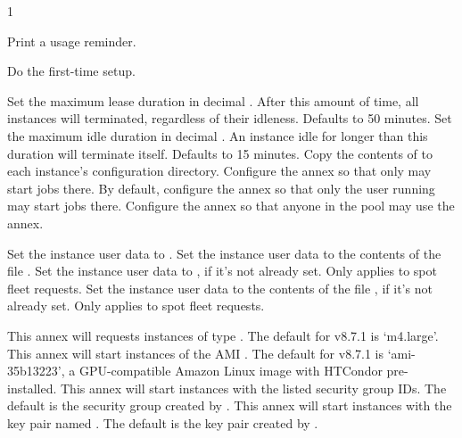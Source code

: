 \begin{ManPage}{\label{man-condor-annex}}{1}
\begin{Options}
		{Print a usage reminder.}

		{Do the first-time setup.}

		{Set the maximum lease duration in decimal .  After this amount of time, all instances will terminated, regardless of their idleness.  Defaults to 50 minutes.}
		{Set the maximum idle duration in decimal .  An instance idle for longer than this duration will terminate itself.  Defaults to 15 minutes.}
		{Copy the contents of  to each instance's configuration directory.}
		{Configure the annex so that only  may start jobs there.  By default, configure the annex so that only the user running  may start jobs there.}
		{Configure the annex so that anyone in the pool may use the annex.}

		{Set the instance user data to .}
		{Set the instance user data to the contents of the file .}
		{Set the instance user data to , if it's not already set.  Only applies to spot fleet requests.}
		{Set the instance user data to the contents of the file , if it's not already set.  Only applies to spot fleet requests.}

		{This annex will requests instances of type .  The default for v8.7.1 is `m4.large'.}
		{This annex will start instances of the AMI .  The default for v8.7.1 is `ami-35b13223', a GPU-compatible Amazon Linux image with HTCondor pre-installed.}
		{This annex will start instances with the listed security group IDs.  The default is the security group created by .}
		{This annex will start instances with the key pair named .  The default is the key pair created by .}


\end{Options}
\end{ManPage}

